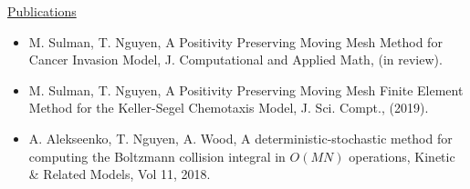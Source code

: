 { {\underline{Publications }}}
\begin{itemize}
\setlength{\itemsep}{0.2pt}
\item M. Sulman, T. Nguyen, A Positivity Preserving Moving Mesh Method for Cancer Invasion Model, J. Computational and Applied Math, (in review).
\item M. Sulman, T. Nguyen, A Positivity Preserving Moving Mesh Finite Element Method for the Keller-Segel Chemotaxis Model, J. Sci. Compt., (2019).
\item A. Alekseenko, T. Nguyen, A. Wood, A deterministic-stochastic method for computing the Boltzmann collision integral in $O(MN)$ operations, Kinetic \& Related Models, Vol 11, 2018.
\end{itemize}